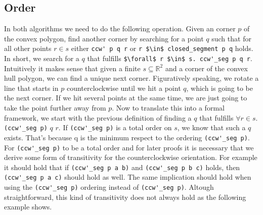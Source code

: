 \subsection{Order}
\label{sec:order}
In both algorithms we need to do the following operation. Given an corner $p$ of the convex polygon,
find another corner by searching for a point $q$ such that for all other points 
$r \in s$ either \lstinline|ccw' p q r| or \lstinline|r $\in$ closed_segment p q|
holds. In short, we search for a $q$ that fulfills  
\lstinline|$\forall$ r $\in$ s. ccw'_seg p q r|. 
Intuitively it makes sense that given a finite 
$s \subseteq \mathbb{R}^2$ and a corner of the convex hull polygon, 
we can find a unique next corner. Figuratively speaking, we rotate a line that 
starts in $p$ counterclockwise until we hit a point $q$, which is going to be the next
corner. If we hit several points at the same time, we are just going to take the point 
further away from $p$. Now to translate this into a formal framework, we start with
the previous definition of finding a $q$ that fulfills 
$\forall r \in s.$ \lstinline|(ccw'_seg p)| $q$ $r$. If \lstinline|(ccw'_seg p)| is a total
order on $s$, we know that such a $q$ exists. That's because q is the minimum
respect to the ordering \lstinline|(ccw'_seg p)|. For \lstinline|(ccw'_seg p)| to be a total order
and for later proofs it is necessary that we derive some form of transitivity for the
counterclockwise orientation. For example it should hold that if \lstinline|(ccw'_seg p a b)|
and \lstinline|(ccw'_seg p b c)| holds, then \lstinline|(ccw'_seg p a c)| should hold 
as well. The same implication should hold when using the \lstinline|(ccw'_seg p)| 
ordering instead of \lstinline|(ccw'_seg p)|. Altough straightforward, this kind of transitivity does not always
hold as the following example shows.

\begin{center}
\begin{minipage}{0.5\textwidth}
  \centering
  
\end{minipage}
\end{center}

